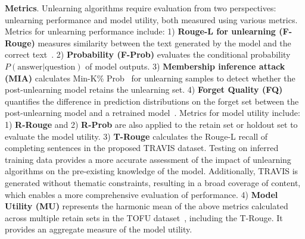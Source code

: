 \documentclass{article}
\theoremstyle{plain}
\theoremstyle{definition}
\theoremstyle{remark}
\begin{document}
\textbf{Metrics}.
Unlearning algorithms require evaluation from two perspectives: unlearning performance and model utility, both measured using various metrics.
Metrics for unlearning performance include:
1) \textbf{Rouge-L for unlearning (F-Rouge)} measures similarity between the text generated by the model and the correct text~\cite{DBLP:journals/corr/abs-2401-06121, DBLP:journals/corr/abs-2407-06460}.
2) \textbf{Probability (F-Prob)} evaluates the conditional probability $P(\text{answer}|\text{question})$ of model outputs.
3) \textbf{Membership inference attack (MIA)} calculates Min-K\% Prob~\cite{DBLP:conf/iclr/ShiAXHLB0Z24} for unlearning samples to detect whether the post-unlearning model retains the unlearning set.
4) \textbf{Forget Quality (FQ)} quantifies the difference in prediction distributions on the forget set between the post-unlearning model and a retrained model~\cite{DBLP:journals/corr/abs-2401-06121}.
Metrics for model utility include:
1) \textbf{R-Rouge} and 2) \textbf{R-Prob} are also applied to the retain set or holdout set to evaluate the model utility.
3) \textbf{T-Rouge} calculates the Rouge-L recall of completing sentences in the proposed TRAVIS dataset. Testing on inferred  training data provides a more accurate assessment of the impact of unlearning algorithms on the pre-existing knowledge of the model. Additionally, TRAVIS is generated without thematic constraints, resulting in a broad coverage of content, which enables a more comprehensive evaluation of performance.
4) \textbf{Model Utility (MU)} represents the harmonic mean of the above metrics calculated across multiple retain sets in the TOFU dataset~\cite{DBLP:journals/corr/abs-2401-06121}, including the T-Rouge. It provides an aggregate measure of the model utility.
\end{document}
